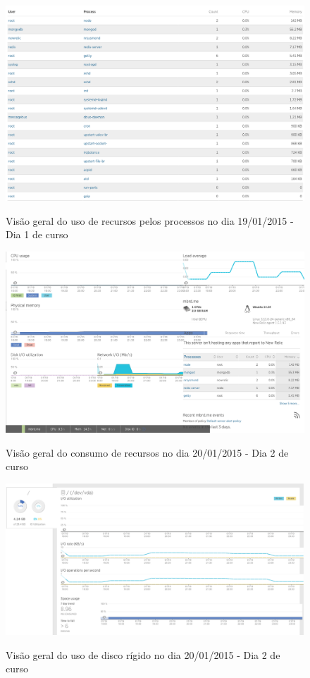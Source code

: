 \documentclass[
	12pt,				%
	oneside,			%
	a4paper,			%
	english,			%
	brazil				%
	]{abntex2ppgsi}
\begin{document}
\begin{apendicesenv}
\begin{figure}[ht]
\centering
\caption{Visão geral do uso de recursos pelos processos no dia 19/01/2015 - Dia 1 de curso}
\includegraphics[page=2,width=1.0\textwidth]{relatorios/19-01-15/process-inspector_cropped.pdf} 
\label{fig:recursos_dia1_5} 
\end{figure}


\begin{figure}[ht]
\centering
\caption{Visão geral do consumo de recursos no dia 20/01/2015 - Dia 2 de curso}
\includegraphics[width=1.0\textwidth]{relatorios/20-01-15/dashboard_cropped.pdf} 
\label{fig:recursos_dia2_1} 
\end{figure}


\begin{figure}[ht]
\centering
\caption{Visão geral do uso de disco rígido no dia 20/01/2015 - Dia 2 de curso}
\includegraphics[width=1.0\textwidth]{relatorios/20-01-15/disk_cropped.pdf} 
\label{fig:recursos_dia2_2} 
\end{figure}


\end{apendicesenv}
\end{document}
